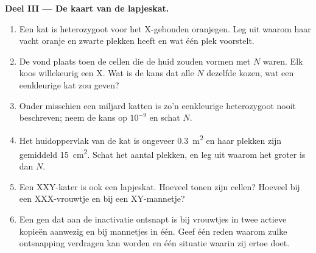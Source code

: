 \begin{problem}
\medskip
\noindent\textbf{Deel III --- De kaart van de lapjeskat.}
\begin{enumerate}[resume]
  \item Een kat is heterozygoot voor het X-gebonden oranjegen. Leg uit
        waarom haar vacht oranje en zwarte plekken heeft en wat één
        plek voorstelt.
  \item De  vond plaats toen de cellen die de huid zouden
        vormen met $N$ waren. Elk koos willekeurig een X. Wat is de
        kans dat alle $N$ dezelfde kozen, wat een eenkleurige kat zou
        geven?
  \item Onder misschien een miljard katten is zo'n eenkleurige
        heterozygoot nooit beschreven; neem de kans op $10^{-9}$ en
        schat $N$.
  \item Het huidoppervlak van de kat is ongeveer \qty{0.3}{m^2} en haar
        plekken zijn gemiddeld \qty{15}{cm^2}. Schat het aantal
        plekken, en leg uit waarom het groter is dan $N$.
  \item Een XXY-kater is ook een lapjeskat. Hoeveel 
        tonen zijn cellen? Hoeveel bij een XXX-vrouwtje en bij een
        XY-mannetje?
  \item Een gen dat aan de inactivatie ontsnapt is bij vrouwtjes in
        twee actieve kopieën aanwezig en bij mannetjes in één. Geef één
        reden waarom zulke ontsnapping verdragen kan worden en één
        situatie waarin zij ertoe doet.
\end{enumerate}


\end{problem}
